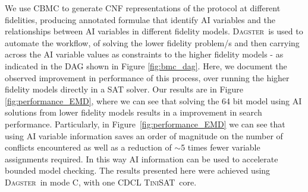 \documentclass[10pt,a4paper,oneside,headinclude,footinclude,BCOR5mm]{scrartcl}
\newcommand{\dagster}{\textsc{Dagster}\xspace}
\newcommand{\tinisat}{\textsc{TiniSAT}\xspace}
\newcommand{\modezero}{C\xspace}
\begin{document}
We use \textsc{CBMC} to generate CNF representations of the protocol at different fidelities, producing annotated formulae that identify AI variables and the relationships between AI variables in different fidelity models. 
\dagster\ is used to automate the workflow, of solving the lower fidelity problem/s and then carrying across the AI variable values as constraints to the higher fidelity models - as indicated in the DAG shown in Figure \ref{fig:bmc_dag}.
Here, we document the observed improvement in performance of this process, over running the higher fidelity models directly in a SAT solver. Our results are in Figure \ref{fig:performance_EMD}, where we can see that solving the 64 bit model using AI solutions from lower fidelity models results in a improvement in search performance.
Particularly, in Figure~\ref{fig:performance_EMD} we can see that using AI variable information saves an order of magnitude on the number of conflicts encountered as well as a reduction of $\sim$5 times fewer variable assignments required.
In this way AI information can be used to accelerate bounded model checking. The results presented here were achieved using \dagster\ in mode \modezero, with one CDCL \tinisat\ core.






\end{document}

